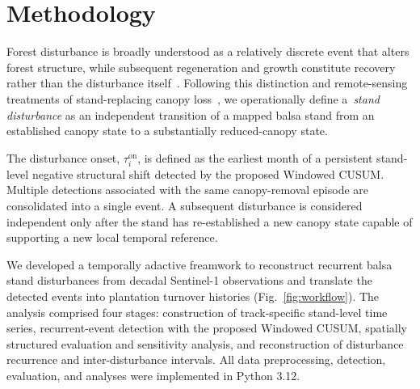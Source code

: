 \section{Methodology}
\label{sec:methods}


Forest disturbance is broadly understood as a relatively discrete event that alters forest structure, while subsequent regeneration and growth constitute recovery rather than the disturbance itself~\citep{Frolking2009ForestDisturbance}. Following this distinction and remote-sensing treatments of stand-replacing canopy loss~\citep{Coops2023NearRealTimeInventory}, we operationally define a~\emph{stand disturbance} as an independent transition of a mapped balsa stand from an established canopy state to a substantially reduced-canopy state.

The disturbance onset, $\tau_i^{\mathrm{on}}$, is defined as the earliest month of a persistent stand-level negative structural shift detected by the proposed Windowed CUSUM. Multiple detections associated with the same canopy-removal episode are consolidated into a single event. A subsequent disturbance is considered independent only after the stand has re-established a new canopy state capable of supporting a new local temporal reference.

We developed a temporally adactive freamwork to reconstruct recurrent balsa stand disturbances from decadal Sentinel-1 observations and translate the detected events into plantation turnover histories (Fig.~\ref{fig:workflow}). The analysis comprised four stages: construction of track-specific stand-level time series, recurrent-event detection with the proposed Windowed CUSUM, spatially structured evaluation and sensitivity analysis, and reconstruction of disturbance recurrence and inter-disturbance intervals. All data preprocessing, detection, evaluation, and analyses were implemented in Python 3.12.

